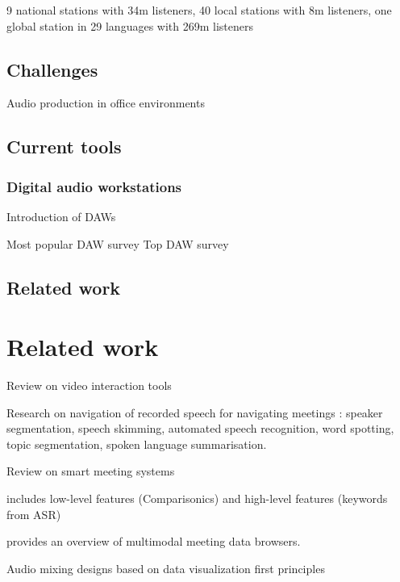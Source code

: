 9 national stations with 34m listeners, 40 local stations with 8m listeners, one global station in 29 languages with
269m listeners

\subsection{Challenges}

Audio production in office environments \citep{Brixen2003}

\subsection{Current tools}

\subsubsection{Digital audio workstations}

Introduction of DAWs \citep{Ingebretsen1982}

Most popular DAW survey \citep{AskAudio2015}
Top DAW survey \citep{ProducerSpot2015}

\subsection{Related work}

\citep{Barbour2004}
\citep{Dunaway2000}
\citep{Sampaio2016}

\section{Related work}


Review on video interaction tools \citep{Schoeffmann2015}

Research on navigation of recorded speech for navigating meetings \citep{Bouamrane2007}: speaker segmentation, speech
skimming, automated speech recognition, word spotting, topic segmentation, spoken language summarisation.

Review on smart meeting systems \citep{Yu2010}

\citet{Loviscach2011a} includes low-level features (Comparisonics) and high-level features (keywords from ASR)

\citet{Tucker2005} provides an overview of multimodal meeting data browsers.


Audio mixing designs based on data visualization first principles \citep{Dewey2016,Dewey2016a}

